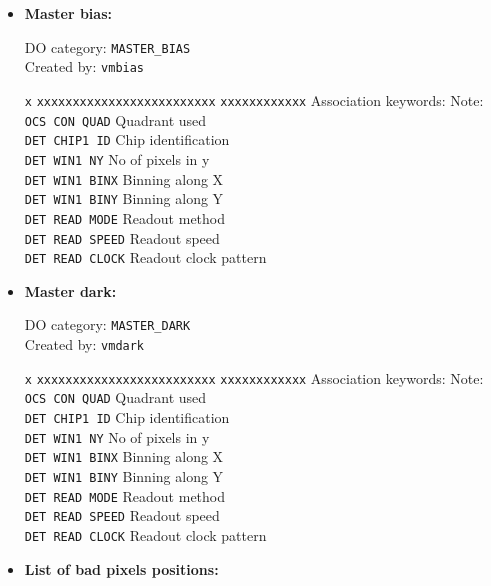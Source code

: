 \begin{itemize}

\item {\bf Master bias:}

DO category: {\tt MASTER\_BIAS} \\
Created by: {\tt vmbias}

\begin{tabbing}
{\tt x} \= {\tt xxxxxxxxxxxxxxxxxxxxxxxxx} \= {\tt xxxxxxxxxxxx} \kill
\> Association keywords: \> Note: \\
\> {\tt OCS CON QUAD} \> Quadrant used \\
\> {\tt DET CHIP1 ID} \> Chip identification \\
\> {\tt DET WIN1 NY} \> No of pixels in y \\
\> {\tt DET WIN1 BINX} \> Binning along X \\
\> {\tt DET WIN1 BINY} \> Binning along Y \\
\> {\tt DET READ MODE} \> Readout method \\
\> {\tt DET READ SPEED} \> Readout speed \\
\> {\tt DET READ CLOCK} \> Readout clock pattern \\
\end{tabbing}


\item {\bf Master dark:}

DO category: {\tt MASTER\_DARK} \\
Created by: {\tt vmdark}

\begin{tabbing}
{\tt x} \= {\tt xxxxxxxxxxxxxxxxxxxxxxxxx} \= {\tt xxxxxxxxxxxx} \kill
\> Association keywords: \> Note: \\
\> {\tt OCS CON QUAD} \> Quadrant used \\
\> {\tt DET CHIP1 ID} \> Chip identification \\
\> {\tt DET WIN1 NY} \> No of pixels in y \\
\> {\tt DET WIN1 BINX} \> Binning along X \\
\> {\tt DET WIN1 BINY} \> Binning along Y \\
\> {\tt DET READ MODE} \> Readout method \\
\> {\tt DET READ SPEED} \> Readout speed \\
\> {\tt DET READ CLOCK} \> Readout clock pattern \\
\end{tabbing}

\item {\bf List of bad pixels positions:}


\end{itemize}
